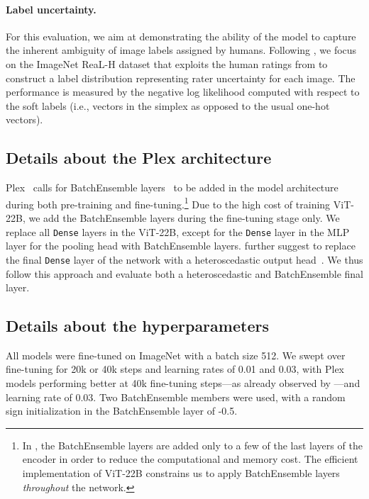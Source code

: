 \paragraph{Label uncertainty.} For this evaluation, we aim at demonstrating the ability of the model to capture the inherent ambiguity of image labels assigned by humans. Following \citet{tran2022plex}, we focus on the ImageNet ReaL-H dataset that exploits the human ratings from \citet{beyer2020we} to construct a label
distribution representing rater uncertainty for each image. The performance is measured by the negative log likelihood computed with respect to the soft labels (i.e., vectors in the simplex as opposed to the usual one-hot vectors).

\subsection{Details about the Plex architecture}

Plex~\citep{tran2022plex} calls for BatchEnsemble layers~\citep{wen2019batchensemble} to be added
in
the model architecture during both pre-training and fine-tuning.\footnote{In \citet{tran2022plex}, the BatchEnsemble layers are added only to a few of the last layers of the encoder in order to reduce the computational and memory cost. The efficient implementation of ViT-22B constrains us to apply BatchEnsemble layers \textit{throughout} the network.} Due to the high cost of training ViT-22B, we add the BatchEnsemble layers during the fine-tuning stage only. We replace all \texttt{Dense} layers in the ViT-22B, except for the \texttt{Dense} layer in the MLP layer for the pooling head with BatchEnsemble layers. \citet{tran2022plex} further suggest to replace the final \texttt{Dense} layer of the network with a heteroscedastic output head~\citep{collier2021correlated}. We thus follow this approach and evaluate both a heteroscedastic and BatchEnsemble final layer.

\subsection{Details about the hyperparameters}

All models were fine-tuned on ImageNet with a batch size 512. We swept over fine-tuning for 20k or 40k steps and learning rates of 0.01 and 0.03, with Plex models performing better at 40k fine-tuning steps---as already observed by \citet{tran2022plex}---and learning rate of 0.03. Two BatchEnsemble members were used, with a random sign initialization in the BatchEnsemble layer of -0.5.

